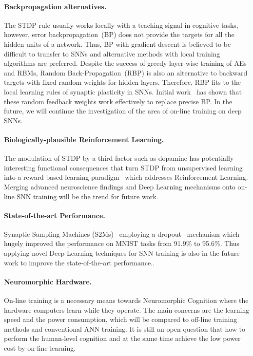 \paragraph{Backpropagation alternatives.}
The STDP rule usually works locally with a teaching signal in cognitive tasks, however, error backpropagation~(BP) does not provide the targets for all the hidden units of a network.
Thus, BP with gradient descent is believed to be difficult to transfer to SNNs and alternative methods with local training algorithms are preferred.
Despite the success of greedy layer-wise training of AEs and RBMs, Random Back-Propagation~(RBP) is also an alternative to backward targets with fixed random weights for hidden layers.
Therefore, RBP fits to the local learning rules of synaptic plasticity in SNNs.
Initial work~\citep{samadi2017deep,neftci2017event} has shown that these random feedback weights work effectively to replace precise BP.  
In the future, we will continue the investigation of the area of on-line training on deep SNNs.

\paragraph{Biologically-plausible Reinforcement Learning.}
The modulation of STDP by a third factor such as dopamine has potentially interesting functional consequences that turn STDP from unsupervised learning into a reward-based learning paradigm~\citep{izhikevich2007solving} which addresses Reinforcement Learning.
Merging advanced neuroscience findings and Deep Learning mechanisms onto on-line SNN training will be the trend for future work.


\paragraph{State-of-the-art Performance.}
Synaptic Sampling Machines (S2Ms)~\citep{neftci2016stochastic} employing a dropout~\citep{srivastava2014dropout} mechanism which hugely improved the performance on MNIST tasks from 91.9\% to 95.6\%.
Thus applying novel Deep Learning techniques for SNN training is also in the future work to improve the state-of-the-art performance..

\paragraph{Neuromorphic Hardware.}
On-line training is a necessary means towards Neuromorphic Cognition where the hardware computers learn while they operate.
The main concerns are the learning speed and the power consumption, which will be compared to off-line training methods and conventional ANN training.
It is still an open question that how to perform the human-level cognition and at the same time achieve the low power cost by on-line learning.



